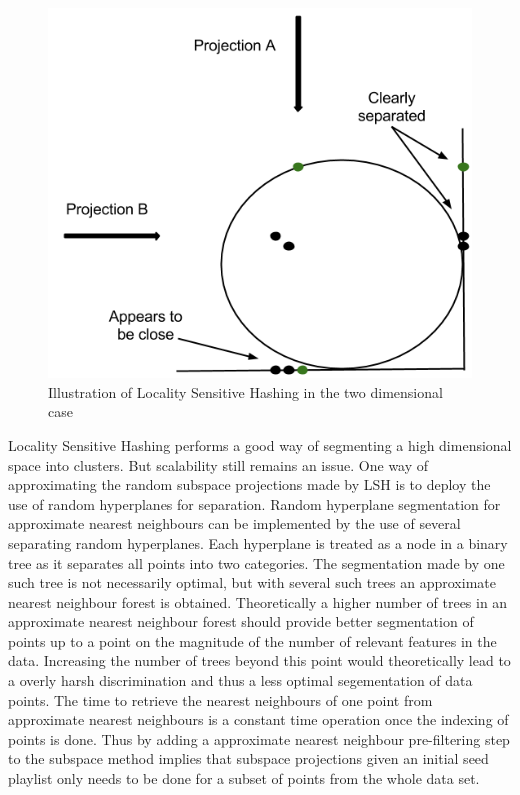 \documentclass[a4paper,11pt]{kth-mag}
\begin{document}
\begin{figure}
\includegraphics[scale=0.5]{images/LSH.png}
\caption{Illustration of Locality Sensitive Hashing in the two dimensional case}
\end{figure}

Locality Sensitive Hashing performs a good way of segmenting a high dimensional space into clusters. But scalability still remains an issue. One way of approximating the random subspace projections made by LSH is to deploy the use of random hyperplanes for separation. Random hyperplane segmentation for approximate nearest neighbours can be implemented by the use of several separating random hyperplanes. Each hyperplane is treated as a node in a binary tree as it separates all points into two categories. The segmentation made by one such tree is not necessarily optimal, but with several such trees an approximate nearest neighbour forest is obtained. Theoretically a higher number of trees in an approximate nearest neighbour forest should provide better segmentation of points up to a point on the magnitude of the number of relevant features in the data. Increasing the number of trees beyond this point would theoretically lead to a overly harsh discrimination and thus a less optimal segementation of data points. The time to retrieve the nearest neighbours of one point from approximate nearest neighbours is a constant time operation once the indexing of points is done. Thus by adding a approximate nearest neighbour pre-filtering step to the subspace method implies that subspace projections given an initial seed playlist only needs to be done for a subset of points from the whole data set.
\end{document}
